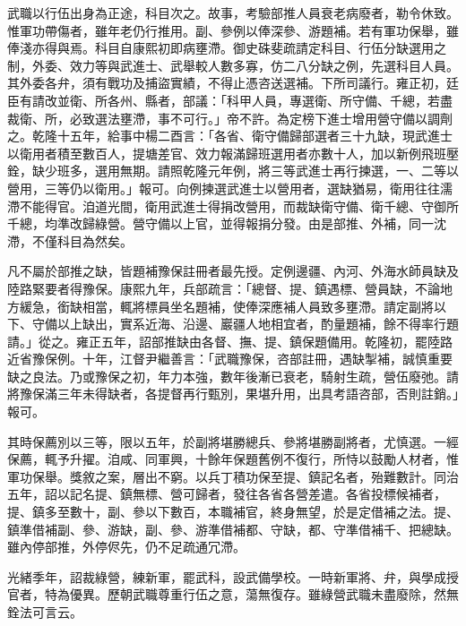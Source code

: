 \begin{pinyinscope}
武職以行伍出身為正途，科目次之。故事，考驗部推人員衰老病廢者，勒令休致。惟軍功帶傷者，雖年老仍行推用。副、參例以俸深參、游題補。若有軍功保舉，雖俸淺亦得與焉。科目自康熙初即病壅滯。御史硃斐疏請定科目、行伍分缺選用之制，外委、效力等與武進士、武舉較人數多寡，仿二八分缺之例，先選科目人員。其外委各弁，須有戰功及捕盜實績，不得止憑咨送選補。下所司議行。雍正初，廷臣有請改並衛、所各州、縣者，部議：「科甲人員，專選衛、所守備、千總，若盡裁衛、所，必致選法壅滯，事不可行。」帝不許。為定榜下進士增用營守備以調劑之。乾隆十五年，給事中楊二酉言：「各省、衛守備歸部選者三十九缺，現武進士以衛用者積至數百人，提塘差官、效力報滿歸班選用者亦數十人，加以新例飛班壓銓，缺少班多，選用無期。請照乾隆元年例，將三等武進士再行揀選，一、二等以營用，三等仍以衛用。」報可。向例揀選武進士以營用者，選缺猶易，衛用往往濡滯不能得官。洎道光間，衛用武進士得捐改營用，而裁缺衛守備、衛千總、守御所千總，均準改歸綠營。營守備以上官，並得報捐分發。由是部推、外補，同一沈滯，不僅科目為然矣。

凡不屬於部推之缺，皆題補豫保註冊者最先授。定例邊疆、內河、外海水師員缺及陸路緊要者得豫保。康熙九年，兵部疏言：「總督、提、鎮遇標、營員缺，不論地方緩急，銜缺相當，輒將標員坐名題補，使俸深應補人員致多壅滯。請定副將以下、守備以上缺出，實系近海、沿邊、巖疆人地相宜者，酌量題補，餘不得率行題請。」從之。雍正五年，詔部推缺由各督、撫、提、鎮保題備用。乾隆初，罷陸路近省豫保例。十年，江督尹繼善言：「武職豫保，咨部註冊，遇缺掣補，誠慎重要缺之良法。乃或豫保之初，年力本強，數年後漸已衰老，騎射生疏，營伍廢弛。請將豫保滿三年未得缺者，各提督再行甄別，果堪升用，出具考語咨部，否則註銷。」報可。

其時保薦別以三等，限以五年，於副將堪勝總兵、參將堪勝副將者，尤慎選。一經保薦，輒予升擢。洎咸、同軍興，十餘年保題舊例不復行，所恃以鼓勵人材者，惟軍功保舉。獎敘之案，層出不窮。以兵丁積功保至提、鎮記名者，殆難數計。同治五年，詔以記名提、鎮無標、營可歸者，發往各省各營差遣。各省投標候補者，提、鎮多至數十，副、參以下數百，本職補官，終身無望，於是定借補之法。提、鎮準借補副、參、游缺，副、參、游準借補都、守缺，都、守準借補千、把總缺。雖內停部推，外停侭先，仍不足疏通冗滯。

光緒季年，詔裁綠營，練新軍，罷武科，設武備學校。一時新軍將、弁，與學成授官者，特為優異。歷朝武職尊重行伍之意，蕩無復存。雖綠營武職未盡廢除，然無銓法可言云。


\end{pinyinscope}